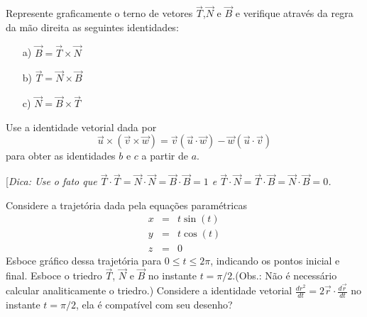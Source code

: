 \begin{exer}
Represente graficamente o terno de vetores $\vec{T}$,$\vec{N}$ e $\vec{B}$ e verifique através da regra da mão direita as seguintes identidades:
\begin{itemize}
\item[a)]$\vec{B}=\vec{T}\times\vec{N}$
\item[b)]$\vec{T}=\vec{N}\times\vec{B}$
\item[c)]$\vec{N}=\vec{B}\times\vec{T}$
\end{itemize}
Use a identidade vetorial dada por
$$\vec{u}\times\left(\vec{v}\times\vec{w}\right)=\vec{v}\left(\vec{u}\cdot\vec{w}\right)-\vec{w}\left(\vec{u}\cdot\vec{v}\right)$$ para obter as identidades $b$ e $c$ a partir de $a$.

[{\it Dica: Use o fato que $\vec{T}\cdot\vec{T}=\vec{N}\cdot\vec{N}=\vec{B}\cdot\vec{B}=1$ e
$\vec{T}\cdot\vec{N}=\vec{T}\cdot\vec{B}=\vec{N}\cdot\vec{B}=0$.}

\end{exer}
\begin{exer}
Considere a trajetória dada pela equações paramétricas
\begin{eqnarray*}
x&=&t\sin (t)\\
y&=&t\cos (t)\\
z&=&0
\end{eqnarray*}
Esboce gráfico dessa trajetória para $0\leq t \leq 2\pi$, indicando os pontos inicial e final. Esboce o triedro $\vec{T}$, $\vec{N}$ e $\vec{B}$ no instante $t=\pi/2$.(Obs.: Não é necessário calcular analiticamente o triedro.) Considere a identidade vetorial $\frac{d r^2}{dt}=2\vec{r}\cdot\frac{d\vec{r}}{dt}$ no instante $t=\pi/2$, ela é compatível com seu desenho?
\end{exer}
